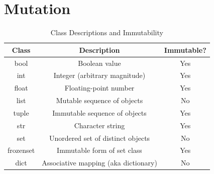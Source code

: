 \documentclass{report}
\begin{document}
    \pagebreak \bigbreak \noindent \section{Mutation}
    \begin{table}[htbp]
      \centering
      \caption{Class Descriptions and Immutability}
      \begin{tabular}{|c|c|c|}
        \hline
        \textbf{Class} & \textbf{Description} & \textbf{Immutable?} \\
        \hline
        \multirow{2}{*}{bool} & \multirow{2}{*}{Boolean value} & \multirow{2}{*}{Yes} \\
         & & \\
        \hline
        \multirow{2}{*}{int} & \multirow{2}{*}{Integer (arbitrary magnitude)} & \multirow{2}{*}{Yes} \\
         & & \\
        \hline
        \multirow{2}{*}{float} & \multirow{2}{*}{Floating-point number} & \multirow{2}{*}{Yes} \\
         & & \\
        \hline
        \multirow{2}{*}{list} & \multirow{2}{*}{Mutable sequence of objects} & \multirow{2}{*}{No} \\
         & & \\
        \hline
        \multirow{2}{*}{tuple} & \multirow{2}{*}{Immutable sequence of objects} & \multirow{2}{*}{Yes} \\
         & & \\
        \hline
        \multirow{2}{*}{str} & \multirow{2}{*}{Character string} & \multirow{2}{*}{Yes} \\
         & & \\
        \hline
        \multirow{2}{*}{set} & \multirow{2}{*}{Unordered set of distinct objects} & \multirow{2}{*}{No} \\
         & & \\
        \hline
        \multirow{2}{*}{frozenset} & \multirow{2}{*}{Immutable form of set class} & \multirow{2}{*}{Yes} \\
         & & \\
        \hline
        \multirow{2}{*}{dict} & \multirow{2}{*}{Associative mapping (aka dictionary)} & \multirow{2}{*}{No} \\
         & & \\
        \hline
      \end{tabular}
      \end{table}
    \bigbreak \noindent
\end{document}
